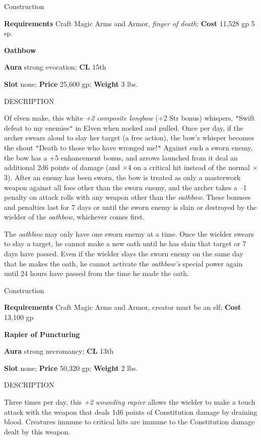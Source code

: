 Construction
				
\textbf{Requirements} Craft Magic Arms and Armor, \textit{finger of death}; \textbf{Cost }11,528 gp 5 sp.
				
\textbf{Oathbow}
				
\textbf{Aura} strong evocation;\textbf{ CL }15th
				
\textbf{Slot} none; \textbf{Price} 25,600 gp; \textbf{Weight} 3 lbs.
				
DESCRIPTION
				
Of elven make, this white \textit{+2 composite longbow} (+2 Str bonus) whispers, \texttt{{}"{}}Swift defeat to my enemies\texttt{{}"{}} in Elven when nocked and pulled. Once per day, if the archer swears aloud to slay her target (a free action), the bow's whisper becomes the shout \texttt{{}"{}}Death to those who have wronged me!\texttt{{}"{}} Against such a sworn enemy, the bow has a +5 enhancement bonus, and arrows launched from it deal an additional 2d6 points of damage (and \mbox{$\times$}4 on a critical hit instead of the normal \mbox{$\times$}3). After an enemy has been sworn, the bow is treated as only a masterwork weapon against all foes other than the sworn enemy, and the archer takes a --1 penalty on attack rolls with any weapon other than the \textit{oathbow}. These bonuses and penalties last for 7 days or until the sworn enemy is slain or destroyed by the wielder of the \textit{oathbow}, whichever comes first.
				
The \textit{oathbow} may only have one sworn enemy at a time. Once the wielder swears to slay a target, he cannot make a new oath until he has slain that target or 7 days have passed. Even if the wielder slays the sworn enemy on the same day that he makes the oath, he cannot activate the \textit{oathbow's} special power again until 24 hours have passed from the time he made the oath. 
				
Construction
				
\textbf{Requirements} Craft Magic Arms and Armor, creator must be an elf; \textbf{Cost }13,100 gp
				
\textbf{Rapier of Puncturing}
				
\textbf{Aura} strong necromancy;\textbf{ CL }13th
				
\textbf{Slot} none; \textbf{Price} 50,320 gp; \textbf{Weight} 2 lbs.
				
DESCRIPTION
				
Three times per day, this \textit{+2 wounding rapier} allows the wielder to make a touch attack with the weapon that deals 1d6 points of Constitution damage by draining blood. Creatures immune to critical hits are immune to the Constitution damage dealt by this weapon. 
				

